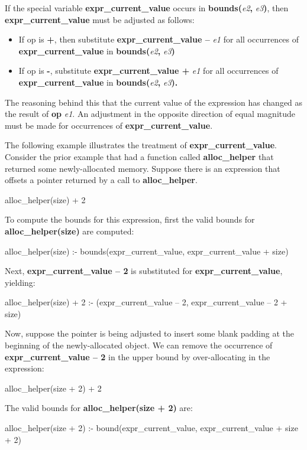 \documentclass[]{article}
\begin{document}
If the special variable \textbf{expr\_current\_value} occurs in
\textbf{bounds(}\emph{e2}\textbf{,} \emph{e3}\textbf{)}, then
\textbf{expr\_current\_value} must be adjusted as follows:

\begin{itemize}
\item
  If op is \textbf{+}, then substitute \textbf{expr\_current\_value --}
  \emph{e1} for all occurrences of \textbf{expr\_current\_value} in
  \textbf{bounds(}\emph{e2}\textbf{,} \emph{e3}\textbf{)}
\item
  If op is \textbf{-}, substitute \textbf{expr\_current\_value +}
  \emph{e1} for all occurrences of \textbf{expr\_current\_value} in
  \textbf{bounds(}\emph{e2}\textbf{,} \emph{e3}\textbf{).}
\end{itemize}

The reasoning behind this that the current value of the expression has
changed as the result of \textbf{op} \emph{e1}. An adjustment in the
opposite direction of equal magnitude must be made for occurrences of
\textbf{expr\_current\_value}.

The following example illustrates the treatment of
\textbf{expr\_current\_value}. Consider the prior example that had a
function called \textbf{alloc\_helper} that returned some
newly-allocated memory. Suppose there is an expression that offsets a
pointer returned by a call to \textbf{alloc\_helper}.

alloc\_helper(size) + 2

To compute the bounds for this expression, first the valid bounds for
\textbf{alloc\_helper(size)} are computed:

alloc\_helper(size) :- bounds(expr\_current\_value, expr\_current\_value
+ size)

Next, \textbf{expr\_current\_value -- 2} is substituted for
\textbf{expr\_current\_value}, yielding:

alloc\_helper(size) + 2 :- (expr\_current\_value -- 2,
expr\_current\_value -- 2 + size)

Now, suppose the pointer is being adjusted to insert some blank padding
at the beginning of the newly-allocated object. We can remove the
occurrence of \textbf{expr\_current\_value -- 2} in the upper bound by
over-allocating in the expression:

alloc\_helper(size + 2) + 2

The valid bounds for \textbf{alloc\_helper(size + 2)} are:

alloc\_helper(size + 2) :- bound(expr\_current\_value,
expr\_current\_value + size + 2)
\end{document}
